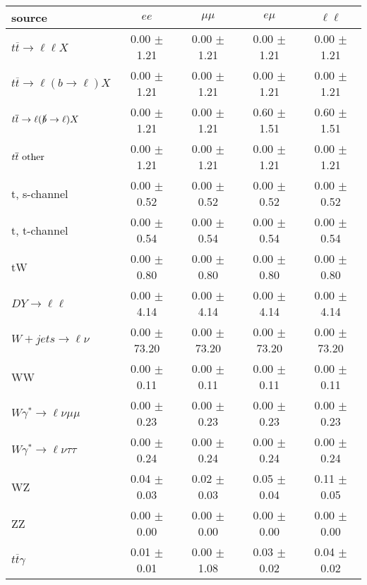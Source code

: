 \begin{tabular}{l|cccc} \hline\hline
source & $ee$ & $\mu\mu$ & $e\mu$ & $\ell\ell $ \\
\hline
$t\overline{t} \rightarrow \ell \ell X$ &  0.00 $\pm$  1.21 &  0.00 $\pm$  1.21 &  0.00 $\pm$  1.21 &  0.00 $\pm$  1.21 \\
$t\overline{t} \rightarrow \ell (b \rightarrow \ell) X$ &  0.00 $\pm$  1.21 &  0.00 $\pm$  1.21 &  0.00 $\pm$  1.21 &  0.00 $\pm$  1.21 \\
$t\overline{t} \rightarrow \ell (\slashed b \rightarrow \ell) X$ &  0.00 $\pm$  1.21 &  0.00 $\pm$  1.21 &  0.60 $\pm$  1.51 &  0.60 $\pm$  1.51 \\
        $t\overline{t}\ \rm{other}$ &  0.00 $\pm$  1.21 &  0.00 $\pm$  1.21 &  0.00 $\pm$  1.21 &  0.00 $\pm$  1.21 \\
\hline
                       t, s-channel &  0.00 $\pm$  0.52 &  0.00 $\pm$  0.52 &  0.00 $\pm$  0.52 &  0.00 $\pm$  0.52 \\
                       t, t-channel &  0.00 $\pm$  0.54 &  0.00 $\pm$  0.54 &  0.00 $\pm$  0.54 &  0.00 $\pm$  0.54 \\
                                 tW &  0.00 $\pm$  0.80 &  0.00 $\pm$  0.80 &  0.00 $\pm$  0.80 &  0.00 $\pm$  0.80 \\
\hline
         $DY \rightarrow \ell \ell$ &  0.00 $\pm$  4.14 &  0.00 $\pm$  4.14 &  0.00 $\pm$  4.14 &  0.00 $\pm$  4.14 \\
      $W+jets \rightarrow \ell \nu$ &  0.00 $\pm$ 73.20 &  0.00 $\pm$ 73.20 &  0.00 $\pm$ 73.20 &  0.00 $\pm$ 73.20 \\
                                 WW &  0.00 $\pm$  0.11 &  0.00 $\pm$  0.11 &  0.00 $\pm$  0.11 &  0.00 $\pm$  0.11 \\
\hline
$W\gamma^{*} \rightarrow \ell \nu \mu\mu$ &  0.00 $\pm$  0.23 &  0.00 $\pm$  0.23 &  0.00 $\pm$  0.23 &  0.00 $\pm$  0.23 \\
$W\gamma^{*} \rightarrow \ell \nu \tau\tau$ &  0.00 $\pm$  0.24 &  0.00 $\pm$  0.24 &  0.00 $\pm$  0.24 &  0.00 $\pm$  0.24 \\
                                 WZ &  0.04 $\pm$  0.03 &  0.02 $\pm$  0.03 &  0.05 $\pm$  0.04 &  0.11 $\pm$  0.05 \\
                                 ZZ &  0.00 $\pm$  0.00 &  0.00 $\pm$  0.00 &  0.00 $\pm$  0.00 &  0.00 $\pm$  0.00 \\
\hline
              $t\overline{t}\gamma$ &  0.01 $\pm$  0.01 &  0.00 $\pm$  1.08 &  0.03 $\pm$  0.02 &  0.04 $\pm$  0.02 \\

\end{tabular}
